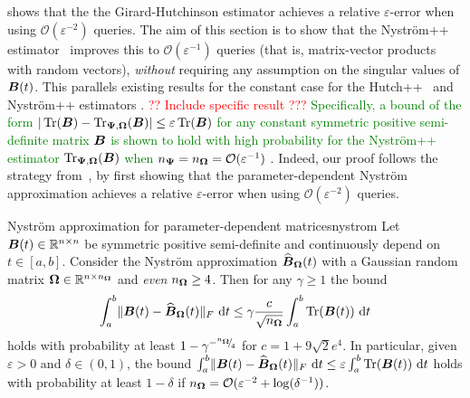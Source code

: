  shows that the the Girard-Hutchinson estimator achieves a relative $\varepsilon$-error when using $\mathcal{O}(\varepsilon^{-2})$ queries. The aim of this section is to show that the Nyström++ estimator~ improves this to $\mathcal{O}(\varepsilon^{-1})$ queries (that is, matrix-vector products with random vectors), \emph{without} requiring any assumption on the singular values of $\boldsymbol{B}(t)$. This parallels existing results for the constant case for the Hutch++~\cite[Theorem 3.1]{meyer-2021-hutch-optimal} and Nyström++ estimators \cite[Theorem 3.4]{persson-2022-improved-variants}. \textcolor{red}{?? Include specific result ???} \textcolor{green}{Specifically, a bound of the form $|\operatorname{Tr}(\boldsymbol{B}) - \operatorname{Tr}_{\boldsymbol{\Psi}, \boldsymbol{\Omega}}(\boldsymbol{B})| \leq \varepsilon \operatorname{Tr}(\boldsymbol{B})$ for any constant symmetric positive semi-definite matrix $\boldsymbol{B}$ is shown to hold with high probability for the Nyström++ estimator $\operatorname{Tr}_{\boldsymbol{\Psi}, \boldsymbol{\Omega}}(\boldsymbol{B})$  when $n_{\boldsymbol{\Psi}} = n_{\boldsymbol{\Omega}} = \mathcal{O}(\varepsilon^{-1})$ }. Indeed, our proof follows the strategy from~\cite{meyer-2021-hutch-optimal}, by first showing that the parameter-dependent Nyström approximation achieves a relative $\varepsilon$-error when using $\mathcal{O}(\varepsilon^{-2})$ queries.

\color{blue}

\begin{lemma}{Nyström approximation for parameter-dependent matrices}{nystrom}
    Let $\boldsymbol{B}(t) \in \mathbb{R}^{n \times n}$ be symmetric positive semi-definite and continuously depend on $t \in [a, b]$. Consider the Nyström approximation $\widehat{\boldsymbol{B}}_{\boldsymbol{\Omega}}(t)$ with a Gaussian random matrix $\boldsymbol{\Omega} \in \mathbb{R}^{n \times n_{\boldsymbol{\Omega}}}$ and \emph{even} $n_{\boldsymbol{\Omega}} \geq 4$.
    Then for any $\gamma \geq 1$ the bound
    \begin{equation}
        \int_{a}^{b} \lVert \boldsymbol{B}(t) - \widehat{\boldsymbol{B}}_{\boldsymbol{\Omega}}(t) \rVert _F~\mathrm{d}t \leq \gamma \frac{c}{\sqrt{n_{\boldsymbol{\Omega}}}} \int_{a}^{b} \operatorname{Tr}(\boldsymbol{B}(t))~\mathrm{d}t
        \label{qu:nystrompp-theorem-bound}
    \end{equation}
        holds with probability at least $1 - \gamma^{-{}^{n_{\boldsymbol{\Omega}}}{\mskip -5mu/\mskip -3mu}_{4}}$ for 
        $c = 1 + 9 \sqrt{2} e^4$. In particular, given $\varepsilon > 0$ and $\delta \in (0, 1)$, the bound $\int_{a}^{b} \lVert \boldsymbol{B}(t) - \widehat{\boldsymbol{B}}_{\boldsymbol{\Omega}}(t) \rVert _F~\mathrm{d}t \leq \varepsilon \int_{a}^{b} \operatorname{Tr}(\boldsymbol{B}(t))~\mathrm{d}t$ holds with probability at least $1-\delta$ if $n_{\boldsymbol{\Omega}} = \mathcal{O}(\varepsilon^{-2} + \log(\delta^{-1}))$.
\end{lemma}

